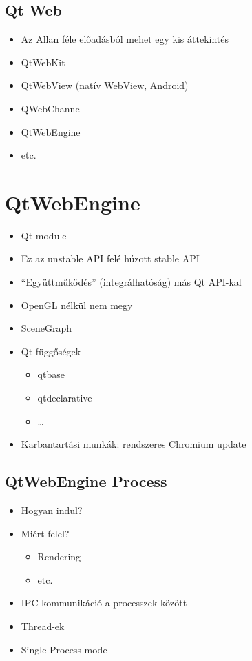 \documentclass[12pt]{report}
\begin{document}
\subsection{Qt Web}
\begin{itemize}
    \item Az Allan féle előadásból mehet egy kis áttekintés
    \item QtWebKit
    \item QtWebView (natív WebView, Android)
    \item QWebChannel
    \item QtWebEngine
    \item etc.
\end{itemize}

\section{QtWebEngine}
\begin{itemize}
    \item Qt module
    \item Ez az unstable API felé húzott stable API
    \item ``Együttműködés'' (integrálhatóság) más Qt API-kal
    \item OpenGL nélkül nem megy
    \item SceneGraph
    \item Qt függőségek
        \begin{itemize}
            \item qtbase
            \item qtdeclarative
            \item \dots
        \end{itemize}
    \item Karbantartási munkák: rendszeres Chromium update
\end{itemize}

\subsection{QtWebEngine Process}
\begin{itemize}
    \item Hogyan indul?
    \item Miért felel?
        \begin{itemize}
            \item Rendering
            \item etc.
        \end{itemize}
    \item IPC kommunikáció a processzek között
    \item Thread-ek
    \item Single Process mode
\end{itemize}
\end{document}
